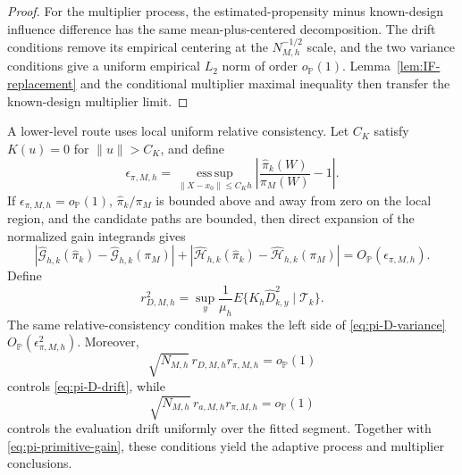 \begin{proof}
For the multiplier process, the estimated-propensity minus known-design influence difference has the same mean-plus-centered decomposition. The drift conditions remove its empirical centering at the \(N_{M,h}^{-1/2}\) scale, and the two variance conditions give a uniform empirical \(L_2\) norm of order \(o_{\mathbb P}(1)\). Lemma~\ref{lem:IF-replacement} and the conditional multiplier maximal inequality then transfer the known-design multiplier limit.
\end{proof}

A lower-level route uses local uniform relative consistency. Let \(C_K\) satisfy \(K(u)=0\) for \(\|u\|>C_K\), and define
\[
\epsilon_{\pi,M,h}
=
\operatorname*{ess\,sup}_{\|X-x_0\|\le C_Kh}
\left|\frac{\widehat\pi_k(W)}{\pi_M(W)}-1\right|.
\]
If \(\epsilon_{\pi,M,h}=o_{\mathbb P}(1)\), \(\widehat\pi_k/\pi_M\) is bounded above and away from zero on the local region, and the candidate paths are bounded, then direct expansion of the normalized gain integrands gives
\begin{equation}
|\widehat{\mathcal G}_{h,k}(\widehat\pi_k)
 -\widehat{\mathcal G}_{h,k}(\pi_M)|
+
|\widehat{\mathcal H}_{h,k}(\widehat\pi_k)
 -\widehat{\mathcal H}_{h,k}(\pi_M)|
=O_{\mathbb P}(\epsilon_{\pi,M,h}).
\label{eq:pi-primitive-gain}
\end{equation}
Define
\[
r_{D,M,h}^2
=
\sup_y
\frac1{\mu_h}
E\{K_h\widehat D_{k,y}^2\mid\mathcal T_k\}.
\]
The same relative-consistency condition makes the left side of \eqref{eq:pi-D-variance} \(O_{\mathbb P}(\epsilon_{\pi,M,h}^2)\). Moreover,
\[
\sqrt{N_{M,h}}\,r_{D,M,h}r_{\pi,M,h}
=o_{\mathbb P}(1)
\]
controls \eqref{eq:pi-D-drift}, while
\[
\sqrt{N_{M,h}}\,r_{a,M,h}r_{\pi,M,h}
=o_{\mathbb P}(1)
\]
controls the evaluation drift uniformly over the fitted segment. Together with \eqref{eq:pi-primitive-gain}, these conditions yield the adaptive process and multiplier conclusions.
